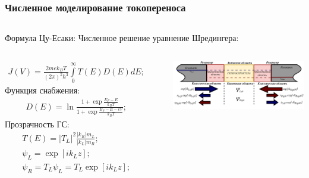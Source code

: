\documentclass[10pt,pdf,hyperref={unicode},aspectratio={169}]{beamer}
\begin{document}
\begin{frame}
	\frametitle{Численное моделирование токопереноса}

\begin{columns}
	\centering
	{\color{blue}\large Формула Цу-Есаки:}
	\centering
	{\color{blue}\large Численное решение уравнение Шредингера:}
\end{columns}


\begin{columns}
	{\footnotesize
	\begin{gather*}
		J(V) = \frac{2mek_{B}T}{(2\pi)^{2}\hbar^{3}}\int\limits_{0}^{\infty}T(E)D(E)dE;
	\end{gather*}}
	{\color{red}Функция снабжения:}
	{\footnotesize
	\begin{gather*}
		D(E) = \ln\frac{1 + \exp{\frac{E_{F}-E}{k_{B}T}} }{ 1 + \exp{\frac{E_{F}-E-eV}{k_{B}T}} };
	\end{gather*}}
	{\color{red}Прозрачность ГС:}
	{\footnotesize
	\begin{gather*}
		T(E) = |T_{L}|^{2}\frac{|k_{R}|m_{L}}{|k_{L}|m_{R}};\\
		\psi_{L} = \exp [ik_{L}z];\\
		\psi_{R} = T_{L}\psi_{L} = T_{L}\exp [ik_{L}z];
	\end{gather*}}
	\rule[1mm]{0.2ex}{70mm}
   	\includegraphics[width=0.8\linewidth,center]{assets/HSModel}


\end{columns}
\end{frame}
\end{document}
